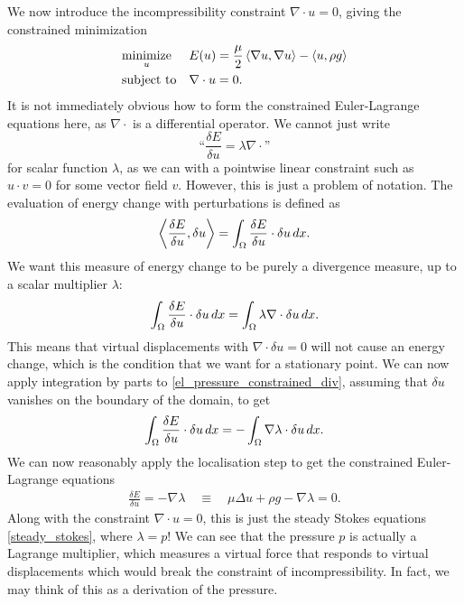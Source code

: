We now introduce the incompressibility constraint $\nabla \cdot u = 0$, giving the constrained minimization
\begin{equation}\label{stokes_flow_optimization}
\begin{aligned}
& \underset{u}{\text{minimize}}
& & E(u) =  \frac{\mu}{2} \left<\nabla u, \nabla u\right> - \left<u, \rho g\right>\\
& \text{subject to}
& & \nabla\cdot u = 0.
\end{aligned}
\end{equation}
It is not immediately obvious how to form the constrained Euler-Lagrange equations here, as $\nabla\cdot$ is a differential operator.
We cannot just write
    $$\text{``}\frac{\delta E}{\delta u} = \lambda\nabla\cdot\text{''}$$
for scalar function $\lambda$, as we can with a pointwise linear constraint such as $u\cdot v = 0$ for some vector field $v$. However, this is just a problem of
notation. The evaluation of energy change with perturbations is defined as
\begin{align*}
    \left<\frac{\delta E}{\delta u}, \delta u\right> = \int_\Omega \frac{\delta E}{\delta u}\cdot\delta u\,dx.
\end{align*}
We want this measure of energy change to be purely a divergence measure, up to a scalar multiplier $\lambda$:
\begin{equation}\label{el_pressure_constrained_div}
    \int_\Omega \frac{\delta E}{\delta u}\cdot\delta u\,dx = \int_{\Omega} \lambda \nabla\cdot \delta u\,dx.
\end{equation}
This means
that virtual displacements with $\nabla\cdot\delta u = 0$ will not cause an energy change, which is the condition that
we want for a stationary point.
We can now apply integration by parts to \eqref{el_pressure_constrained_div}, assuming that $\delta u$ vanishes on the boundary of the domain, to get
\begin{equation}
    \int_\Omega \frac{\delta E}{\delta u}\cdot\delta u\,dx = -\int_{\Omega} \nabla\lambda \cdot \delta u\,dx.
\end{equation}
We can now reasonably apply the localisation step to get the constrained Euler-Lagrange equations
\begin{equation}
\begin{split}
           \frac{\delta E}{\delta u} = -\nabla \lambda
    \quad\equiv\quad \mu\Delta u + \rho g - \nabla \lambda = 0.
\end{split}
\end{equation}
Along with the constraint $\nabla\cdot u = 0$, this is just the steady Stokes equations \eqref{steady_stokes}, where $\lambda = p$! We can see that the pressure $p$
is actually
a Lagrange multiplier, which measures a virtual force that responds to virtual displacements which would break the constraint of incompressibility.
In fact, we may think of this as a derivation of the pressure.

